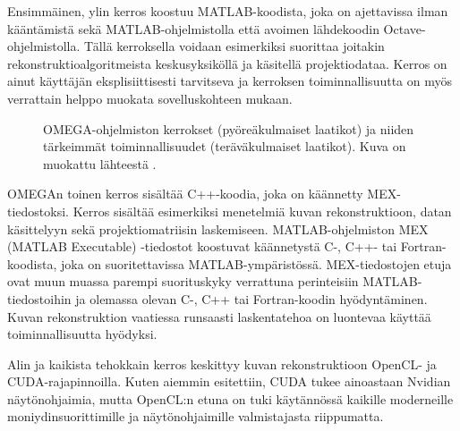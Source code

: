 Ensimmäinen, ylin kerros koostuu MATLAB-koodista, joka on ajettavissa ilman kääntämistä sekä MATLAB-ohjelmistolla että avoimen lähdekoodin Octave-ohjelmistolla. Tällä kerroksella voidaan esimerkiksi suorittaa joitakin rekonstruktioalgoritmeista keskusyksiköllä ja käsitellä projektiodataa. Kerros on ainut käyttäjän eksplisiittisesti tarvitseva ja kerroksen toiminnallisuutta on myös verrattain helppo muokata sovelluskohteen mukaan.\cite{wettenhovi_transmission_2021, wettenhovi_omegaopen-source_2021}

\begin{figure}[H]
    \centering
    \captionsetup{width=.9\textwidth}
    \resizebox{.9\linewidth}{!}{
        
    }
    \caption{OMEGA-ohjelmiston kerrokset (pyöreäkulmaiset laatikot) ja niiden tärkeimmät toiminnallisuudet (teräväkulmaiset laatikot). Kuva on muokattu lähteestä \cite{wettenhovi_omegaopen-source_2021}.}
    \label{fig:omega-kerrokset}
\end{figure}

OMEGAn toinen kerros sisältää C++-koodia, joka on käännetty MEX-tiedostoksi. Kerros sisältää esimerkiksi menetelmiä kuvan rekonstruktioon, datan käsittelyyn sekä projektiomatriisin laskemiseen.\cite{wettenhovi_transmission_2021, wettenhovi_omegaopen-source_2021} MATLAB-ohjelmiston MEX (MATLAB Executable) -tiedostot koostuvat käännetystä C-, C++- tai Fortran-koodista, joka on suoritettavissa MATLAB-ympäristössä. MEX-tiedostojen etuja ovat muun muassa parempi suorituskyky verrattuna perinteisiin MATLAB-tiedostoihin ja olemassa olevan C-, C++ tai Fortran-koodin hyödyntäminen. Kuvan rekonstruktion vaatiessa runsaasti laskentatehoa on luontevaa käyttää toiminnallisuutta hyödyksi.

Alin ja kaikista tehokkain kerros keskittyy kuvan rekonstruktioon OpenCL- ja CUDA-rajapinnoilla\cite{wettenhovi_transmission_2021, wettenhovi_omegaopen-source_2021}. Kuten aiemmin esitettiin, CUDA tukee ainoastaan Nvidian näytönohjaimia, mutta OpenCL:n etuna on tuki käytännössä kaikille moderneille moniydinsuorittimille ja näytönohjaimille valmistajasta riippumatta\cite{stone_opencl_2010}.